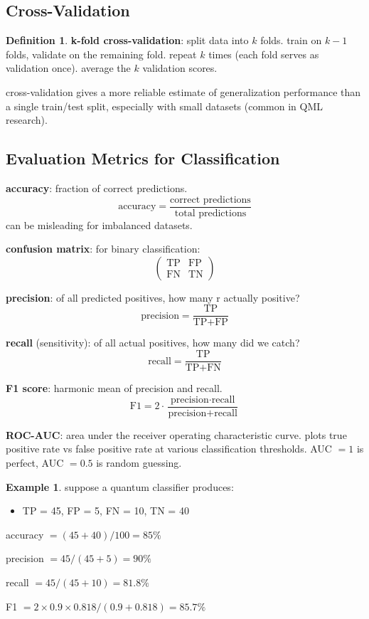 \documentclass[11pt,a4paper]{article}
\theoremstyle{definition}
\newtheorem{definition}{Definition}[section]
\newtheorem{example}{Example}[section]
\theoremstyle{remark}
\begin{document}
\subsection{Cross-Validation}

\begin{definition}
\textbf{k-fold cross-validation}: split data into $k$ folds. train on $k-1$ folds, validate on the remaining fold. repeat $k$ times (each fold serves as validation once). average the $k$ validation scores.
\end{definition}

cross-validation gives a more reliable estimate of generalization performance than a single train/test split, especially with small datasets (common in QML research).

\subsection{Evaluation Metrics for Classification}

\textbf{accuracy}: fraction of correct predictions.
\[
\text{accuracy} = \frac{\text{correct predictions}}{\text{total predictions}}
\]
can be misleading for imbalanced datasets.

\textbf{confusion matrix}: for binary classification:
\[
\begin{pmatrix} \text{TP} & \text{FP} \\ \text{FN} & \text{TN} \end{pmatrix}
\]

\textbf{precision}: of all predicted positives, how many r actually positive?
\[
\text{precision} = \frac{\text{TP}}{\text{TP} + \text{FP}}
\]

\textbf{recall} (sensitivity): of all actual positives, how many did we catch?
\[
\text{recall} = \frac{\text{TP}}{\text{TP} + \text{FN}}
\]

\textbf{F1 score}: harmonic mean of precision and recall.
\[
\text{F1} = 2 \cdot \frac{\text{precision} \cdot \text{recall}}{\text{precision} + \text{recall}}
\]

\textbf{ROC-AUC}: area under the receiver operating characteristic curve. plots true positive rate vs false positive rate at various classification thresholds. AUC $= 1$ is perfect, AUC $= 0.5$ is random guessing.

\begin{example}
suppose a quantum classifier produces:
\begin{itemize}
    \item TP = 45, FP = 5, FN = 10, TN = 40
\end{itemize}

accuracy $= (45 + 40) / 100 = 85\%$

precision $= 45 / (45 + 5) = 90\%$

recall $= 45 / (45 + 10) = 81.8\%$

F1 $= 2 \times 0.9 \times 0.818 / (0.9 + 0.818) = 85.7\%$
\end{example}
\end{document}
